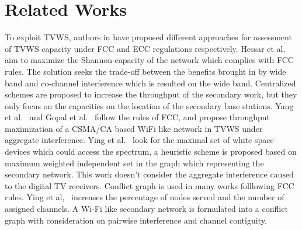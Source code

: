 \documentclass[times]{ettauth}
\theoremstyle{mytheoremstyle}
\theoremstyle{mytheoremstyle}
\theoremstyle{mytheoremstyle}
\begin{document}
\section{Related Works}
\label{decomposition_relatedwork}




To exploit TVWS, authors in \cite{DySpAN10MeasuringWhitespaceCapacity, HessarTMC15, Deshmukh2015, Achtzehn12} have proposed different approaches for assessment of TVWS capacity under FCC and ECC regulations respectively.
Hessar et al.~\cite{ReAlloTVWS14DySPAN} aim to maximize the Shannon capacity of the network which complies with FCC rules.
The solution seeks the trade-off between the benefits brought in by wide band and co-channel interference which is resulted on the wide band.
Centralized schemes are proposed to increase the throughput of the secondary work, but they only focus on the capacities on the location of the secondary base stations.
Yang et al.~\cite{yang2013WiFiWSTVCapacity} and Gopal et al.~\cite{gopalTCCN16} follow the rules of FCC, and propose throughput maximization of a CSMA/CA based WiFi like network in TVWS under aggregate interference.
Ying et al.~\cite{Ying2018DySPAN} look for the maximal set of white space devices which could access the spectrum, a heuristic scheme is proposed based on maximum weighted independent set in the graph which representing the secondary network.
This work doesn't consider the aggregate interference caused to the digital TV receivers.
Conflict graph is used in many works folllowing FCC rules. Ying et al,~\cite{conflictGraphTWC2018} increases the percentage of nodes served and the number of assigned channels. A Wi-Fi like secondary network is formulated into a conflict graph with consideration on pairwise interference and channel contiguity. 
\end{document}

